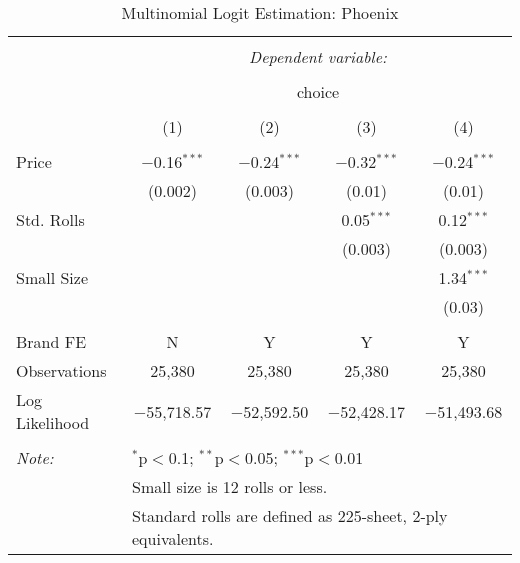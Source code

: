 
\begin{table}[!htbp] \centering 
  \caption{Multinomial Logit Estimation: Phoenix} 
  \label{tab:mnlPhoenixBaseline} 
\begin{tabular}{@{\extracolsep{5pt}}lcccc} 
\\[-1.8ex]\hline 
\hline \\[-1.8ex] 
 & \multicolumn{4}{c}{\textit{Dependent variable:}} \\ 
\cline{2-5} 
\\[-1.8ex] & \multicolumn{4}{c}{choice} \\ 
\\[-1.8ex] & (1) & (2) & (3) & (4)\\ 
\hline \\[-1.8ex] 
 Price & $-$0.16$^{***}$ & $-$0.24$^{***}$ & $-$0.32$^{***}$ & $-$0.24$^{***}$ \\ 
  & (0.002) & (0.003) & (0.01) & (0.01) \\ 
  Std. Rolls &  &  & 0.05$^{***}$ & 0.12$^{***}$ \\ 
  &  &  & (0.003) & (0.003) \\ 
  Small Size &  &  &  & 1.34$^{***}$ \\ 
  &  &  &  & (0.03) \\ 
 \hline \\[-1.8ex] 
Brand FE & N & Y & Y & Y \\ 
Observations & 25,380 & 25,380 & 25,380 & 25,380 \\ 
Log Likelihood & $-$55,718.57 & $-$52,592.50 & $-$52,428.17 & $-$51,493.68 \\ 
\hline 
\hline \\[-1.8ex] 
\textit{Note:}  & \multicolumn{4}{l}{$^{*}$p$<$0.1; $^{**}$p$<$0.05; $^{***}$p$<$0.01} \\ 
 & \multicolumn{4}{l}{Small size is 12 rolls or less.} \\ 
 & \multicolumn{4}{l}{Standard rolls are defined as 225-sheet, 2-ply equivalents.} \\ 
\end{tabular} 
\end{table} 
